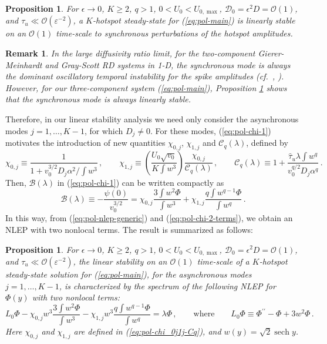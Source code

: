 \documentclass{article}%
\newtheorem{rem}[theorem]{Remark}
\newtheorem{prop}[theorem]{Proposition}
\newcommand{\eps}{{\displaystyle \varepsilon}}
\DeclareMathOperator{\sech}{sech}
\begin{document}
\begin{prop}\label{prop:sync} For $\epsilon\to 0$, $K\geq 2$, $q>1$, 
$0<U_0<U_{0,\max}$, ${\mathcal D}_0=\epsilon^2 D = {\mathcal O}(1)$,
  and $\tau_u\ll {\mathcal O}(\eps^{-2})$, a $K$-hotspot steady-state
  for (\ref{eq:pol-main}) is linearly stable on an ${\mathcal O}(1)$
  time-scale to synchronous perturbations of the hotspot amplitudes.
\end{prop}

\begin{rem}\label{rd:sync} 
In the large diffusivity ratio limit, for the two-component
Gierer-Meinhardt and Gray-Scott RD systems in 1-D, the synchronous
mode is always the dominant oscillatory temporal instability for the
spike amplitudes (cf.~\cite{mjww_1}, \cite{kww_gs}). However, for
our three-component system (\ref{eq:pol-main}), Proposition
\ref{prop:sync} shows that the synchronous mode is always linearly
stable.
\end{rem}

Therefore, in our linear stability analysis we need only consider the
asynchronous modes $j=1,\ldots,K-1$, for which $D_j\neq 0$. For these
modes, (\ref{eq:pol-chi-1}) motivates the introduction
of new quantities $\chi_{0,j}$, $\chi_{1,j}$ and ${\mathcal
  C}_q(\lambda)$, defined by
\begin{equation}
\chi_{0,j}\equiv\frac{1}{1+v_{0}^{3/2}D_{j}\alpha^2/\int w^{3}}\,,\qquad
\chi_{1,j}\equiv \left( \frac{U_{0}\sqrt{v_{0}}}{K\int w^{3}}\right)
\frac{\chi_{0,j}}{\mathcal{C}_{q}(\lambda)}\,, \qquad
\mathcal{C}_{q}(\lambda)\equiv 1+\frac{\hat{\tau}_{u}\lambda \int w^q }
{v_{0}^{q/2}D_{j}\alpha^q } \,. \label{eq:pol-chi_0j1j-Cq}
\end{equation}
Then, ${\mathcal B}(\lambda)$ in (\ref{eq:pol-chi-1}) can be written
compactly as
\begin{equation}
{\mathcal B}(\lambda)\equiv -\frac{\psi(0)}{v_0^{3/2}} =
\chi_{0,j}\frac{3\int w^{2}\Phi}{\int w^{3}}+
\chi_{1,j} \frac{q\int w^{q-1}\Phi}{\int w^{q}}\,.
\label{eq:pol-chi-2-terms}
\end{equation}
In this way, from (\ref{eq:pol-nlep-generic}) and
(\ref{eq:pol-chi-2-terms}), we obtain an NLEP with two nonlocal terms.
The result is summarized as follows:

\begin{prop}\label{main:stab_0} For $\epsilon\to 0$, $K\geq 2$, $q>1$, 
$0<U_0<U_{0,\max}$, ${\mathcal D}_0=\epsilon^2 D = {\mathcal
    O}(1)$, and $\tau_u\ll {\mathcal O}(\eps^{-2})$, the linear
  stability on an ${\mathcal O}(1)$ time-scale of a $K$-hotspot
  steady-state solution for (\ref{eq:pol-main}), for the asynchronous
  modes $j=1,\ldots,K-1$, is characterized by the spectrum of the
  following NLEP for $\Phi(y)$ with two nonlocal terms:
\begin{equation}\label{stab:nlep_old}
  L_{0}\Phi- \chi_{0,j} w^3\frac{3 \int w^2\Phi }{\int w^3} - 
   \chi_{1,j} w^3 \frac{q \int w^{q-1} \Phi}{\int w^q} = \lambda
   \Phi\,, \qquad \mbox{where} \qquad
 L_{0}\Phi \equiv  \Phi^{\prime\prime}-\Phi+3w^{2}\Phi \,.
\end{equation}
Here $\chi_{0,j}$ and $\chi_{1,j}$ are defined in
(\ref{eq:pol-chi_0j1j-Cq}), and $w(y)=\sqrt{2}\sech y$.
\end{prop}
\end{document}
